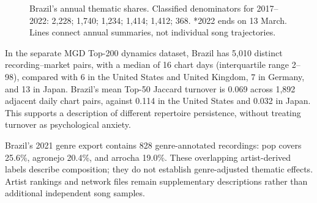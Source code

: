\documentclass[10pt,a4paper,twocolumn]{article}
\begin{document}
\begin{figure}[t]
\centering
{}
\caption{Brazil's annual thematic shares. Classified denominators for 2017--2022: 2,228; 1,740; 1,234; 1,414; 1,412; 368. *2022 ends on 13 March. Lines connect annual summaries, not individual song trajectories.}
\label{fig:brazil}
\end{figure}

In the separate MGD Top-200 dynamics dataset, Brazil has 5,010 distinct recording--market pairs, with a median of 16 chart days (interquartile range 2--98), compared with 6 in the United States and United Kingdom, 7 in Germany, and 13 in Japan. Brazil's mean Top-50 Jaccard turnover is 0.069 across 1,892 adjacent daily chart pairs, against 0.114 in the United States and 0.032 in Japan. This supports a description of different repertoire persistence, without treating turnover as psychological anxiety.

Brazil's 2021 genre export contains 828 genre-annotated recordings: pop covers 25.6\%, agronejo 20.4\%, and arrocha 19.0\%. These overlapping artist-derived labels describe composition; they do not establish genre-adjusted thematic effects. Artist rankings and network files remain supplementary descriptions rather than additional independent song samples.
\end{document}
